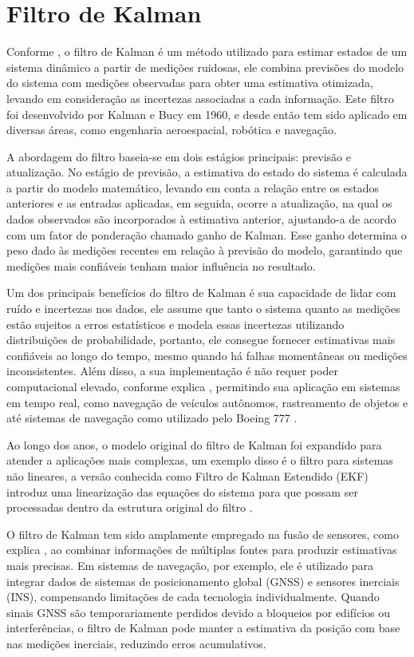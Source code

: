 \section{Filtro de Kalman}

Conforme \cite{kalman1960}, o filtro de Kalman é um método utilizado para estimar estados de um sistema dinâmico a partir de medições ruidosas, ele combina previsões do modelo do sistema com medições observadas para obter uma estimativa otimizada, levando em consideração as incertezas associadas a cada informação. Este filtro foi desenvolvido por Kalman e Bucy em 1960, e desde então tem sido aplicado em diversas áreas, como engenharia aeroespacial, robótica e navegação.

A abordagem do filtro baseia-se em dois estágios principais: previsão e atualização. No estágio de previsão, a estimativa do estado do sistema é calculada a partir do modelo matemático, levando em conta a relação entre os estados anteriores e as entradas aplicadas, em seguida, ocorre a atualização, na qual os dados observados são incorporados à estimativa anterior, ajustando-a de acordo com um fator de ponderação chamado ganho de Kalman. Esse ganho determina o peso dado às medições recentes em relação à previsão do modelo, garantindo que medições mais confiáveis tenham maior influência no resultado.

Um dos principais benefícios do filtro de Kalman é sua capacidade de lidar com ruído e incertezas nos dados, ele assume que tanto o sistema quanto as medições estão sujeitos a erros estatísticos e modela essas incertezas utilizando distribuições de probabilidade, portanto, ele consegue fornecer estimativas mais confiáveis ao longo do tempo, mesmo quando há falhas momentâneas ou medições inconsistentes. Além disso, a sua implementação é não requer poder computacional elevado, conforme explica \cite{gan2001}, permitindo sua aplicação em sistemas em tempo real, como navegação de veículos autônomos, rastreamento de objetos e até sistemas de navegação como utilizado pelo Boeing 777 \cite{cipra1993}.

Ao longo dos anos, o modelo original do filtro de Kalman foi expandido para atender a aplicações mais complexas, um exemplo disso é o filtro para sistemas não lineares, a versão conhecida como Filtro de Kalman Estendido (EKF) introduz uma linearização das equações do sistema para que possam ser processadas dentro da estrutura original do filtro \cite{welch2001}.

O filtro de Kalman tem sido amplamente empregado na fusão de sensores, como explica \cite{li2015}, ao combinar informações de múltiplas fontes para produzir estimativas mais precisas. Em sistemas de navegação, por exemplo, ele é utilizado para integrar dados de sistemas de posicionamento global (GNSS) e sensores inerciais (INS), compensando limitações de cada tecnologia individualmente. Quando sinais GNSS são temporariamente perdidos devido a bloqueios por edifícios ou interferências, o filtro de Kalman pode manter a estimativa da posição com base nas medições inerciais, reduzindo erros acumulativos.


